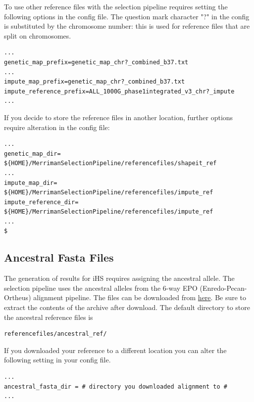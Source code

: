 \documentclass[a4paper,10pt]{article}
\begin{document}
To use other reference files with the selection pipeline requires
setting the following options in the config file. The question mark character
"?" in the config is substituted by the chromosome number: this is
used for reference files that are split on chromosomes.\\


\begin{verbatim}
...
genetic_map_prefix=genetic_map_chr?_combined_b37.txt
...
impute_map_prefix=genetic_map_chr?_combined_b37.txt
impute_reference_prefix=ALL_1000G_phase1integrated_v3_chr?_impute
...
\end{verbatim}

\noindent
If you decide to store the reference files in another location,
further options require alteration in the config file:\\ 
\begin{verbatim}
...
genetic_map_dir= ${HOME}/MerrimanSelectionPipeline/referencefiles/shapeit_ref
...
impute_map_dir= ${HOME}/MerrimanSelectionPipeline/referencefiles/impute_ref
impute_reference_dir= ${HOME}/MerrimanSelectionPipeline/referencefiles/impute_ref
...
$
\end{verbatim}

\subsection{Ancestral Fasta Files}
The generation of results for iHS requires assigning the ancestral
allele. The selection pipeline uses the ancestral alleles from the
6-way EPO (Enredo-Pecan-Ortheus) alignment pipeline. The files can be
downloaded from
\href{ftp://ftp.1000genomes.ebi.ac.uk/vol1/ftp/phase1/analysis_results/supporting/ancestral_alignments/human_ancestor_GRCh37_e59.tar.bz2}{here}. Be
sure to extract the contents of the archive after download. The default
directory to store the ancestral reference files is\\
\begin{verbatim}
referencefiles/ancestral_ref/
\end{verbatim}

\noindent
If you downloaded your reference to a different location you can alter the following setting in your config file.\\
\begin{verbatim}
...
ancestral_fasta_dir = # directory you downloaded alignment to #
...
\end{verbatim}
\end{document}
